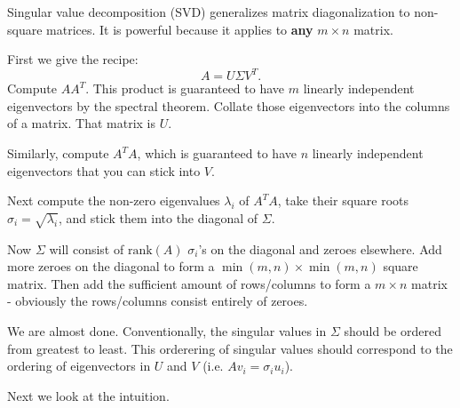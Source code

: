 \documentclass{article}
\begin{document}
Singular value decomposition (SVD) generalizes matrix diagonalization to non-square matrices. 
It is powerful because it applies to \textbf{any} $m \times n$ matrix.

First we give the recipe: 
\begin{equation} 
    A = U \Sigma V^T. \label{eq:SVD} \tag{SVD}
\end{equation}
Compute $AA^T$. This product is guaranteed to have $m$ linearly independent eigenvectors by the 
spectral theorem. Collate those eigenvectors into the columns of a matrix. That matrix is $U$. 

Similarly, compute $A^TA$, which is guaranteed to have $n$ linearly independent eigenvectors 
that you can stick into $V$.

Next compute the non-zero eigenvalues $\lambda_i$ of $A^TA$, take their square roots 
$\sigma_i = \sqrt{\lambda_i}$, and stick them into the diagonal of $\Sigma$. 

Now $\Sigma$ will consist of $\text{rank}(A)$ $\sigma_i$'s on the diagonal and zeroes elsewhere.
Add more zeroes on the diagonal to form a $\min(m, n) \times \min(m, n)$ square matrix. Then add the sufficient
amount of rows/columns to form a $m \times n$ matrix - obviously the rows/columns consist 
entirely of zeroes.

We are almost done. Conventionally, the singular values in $\Sigma$ should be ordered from greatest
to least. This orderering of singular values should correspond to the ordering of 
eigenvectors in $U$ and $V$ (i.e. $Av_i = \sigma_iu_i$).

Next we look at the intuition.
\end{document}
